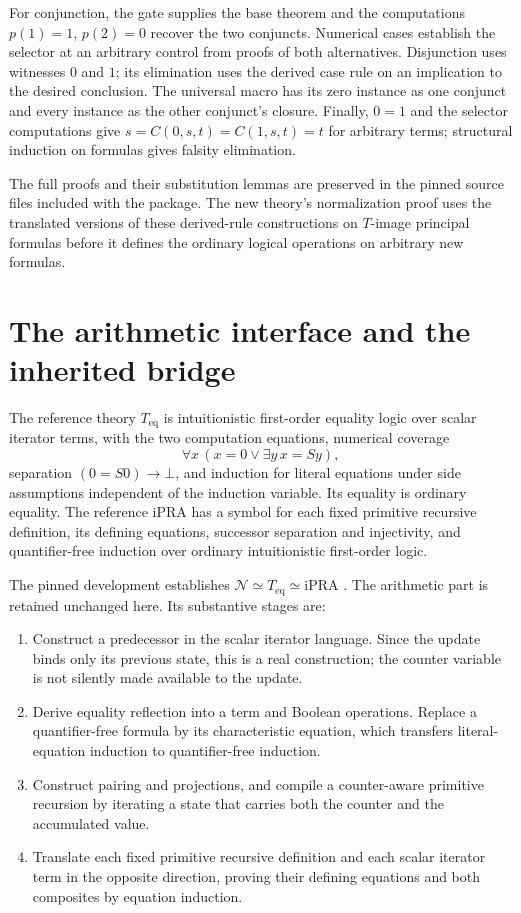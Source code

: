 \documentclass[11pt,a4paper]{article}
\theoremstyle{definition}\newtheorem{definition}[theorem]{Definition}
\newcommand{\ipra}{\mathrm{iPRA}}
\newcommand{\Teq}{T_{\mathrm{eq}}}
\begin{document}
For conjunction, the gate supplies the base theorem and the computations
$p(1)=1$, $p(2)=0$ recover the two conjuncts. Numerical cases establish
the selector at an arbitrary control from proofs of both alternatives.
Disjunction uses witnesses $0$ and $1$; its elimination uses the derived
case rule on an implication to the desired conclusion. The universal
macro has its zero instance as one conjunct and every instance as the
other conjunct's closure. Finally, $0=1$ and the selector computations
give $s=C(0,s,t)=C(1,s,t)=t$ for arbitrary terms; structural induction
on formulas gives falsity elimination.

The full proofs and their substitution lemmas are preserved in the
pinned source files included with the package. The new theory's
normalization proof uses the translated versions of these derived-rule
constructions on $T$-image principal formulas before it defines the
ordinary logical operations on arbitrary new formulas.



\section{The arithmetic interface and the inherited bridge}
\label{app:arithmetic-bridge}

The reference theory $\Teq$ is intuitionistic first-order equality logic
over scalar iterator terms, with the two computation equations,
numerical coverage
\[
\forall x\,(x=0\vee\exists y\,x=Sy),
\]
separation $(0=S0)\to\bot$, and induction for literal equations under
side assumptions independent of the induction variable. Its equality
is ordinary equality. The reference iPRA has a symbol for each fixed
primitive recursive definition, its defining equations, successor
separation and injectivity, and quantifier-free induction over ordinary
intuitionistic first-order logic.

The pinned development establishes $\mathcal N\simeq\Teq\simeq\ipra$
\cite{bridge}. The arithmetic part is retained unchanged here. Its
substantive stages are:
\begin{enumerate}
\item Construct a predecessor in the scalar iterator language. Since the
update binds only its previous state, this is a real construction; the
counter variable is not silently made available to the update.
\item Derive equality reflection into a term and Boolean operations.
Replace a quantifier-free formula by its characteristic equation, which
transfers literal-equation induction to quantifier-free induction.
\item Construct pairing and projections, and compile a counter-aware
primitive recursion by iterating a state that carries both the counter
and the accumulated value.
\item Translate each fixed primitive recursive definition and each
scalar iterator term in the opposite direction, proving their defining
equations and both composites by equation induction.
\end{enumerate}
\end{document}
